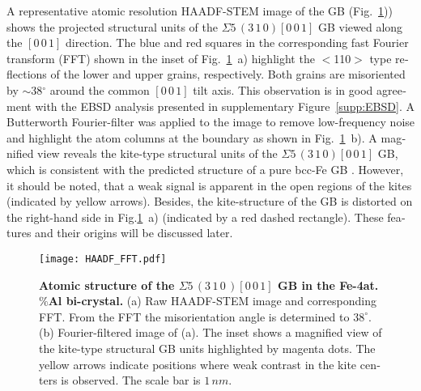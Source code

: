 \documentclass[12pt,a4paper,twoside,twocolumn,english,english]{article}
\begin{document}
\begin{otherlanguage}{english}
A representative atomic resolution HAADF-STEM image of the GB (Fig.~\ref{HAADF_FFT})) shows the projected structural units of the $\Sigma 5\,(3\,1\,0)[0\,0\,1]$ GB viewed along the $[0\,0\,1]$ direction. The blue and red squares in the corresponding fast Fourier transform (FFT) shown in the inset of Fig.~\ref{HAADF_FFT}~a) highlight the $<$110$>$ type reflections of the lower and upper grains, respectively. Both grains are misoriented by $\sim$38$^\circ$ around the common $[0\,0\,1]$ tilt axis. This observation is in good agreement with the EBSD analysis presented in supplementary Figure~\ref{supp:EBSD}. A Butterworth Fourier-filter was applied to the image to remove low-frequency noise and highlight the atom columns at the boundary as shown in Fig.~\ref{HAADF_FFT}~b). A magnified view reveals the kite-type structural units of the $\Sigma 5\,(3\,1\,0)[0\,0\,1]$ GB, which is consistent with the predicted structure of a pure bcc-Fe GB \cite{cak_first-principles_2008, medlin_defect_2017}. However, it should be noted, that a weak signal is apparent in the open regions of the kites (indicated by yellow arrows). Besides, the kite-structure of the GB is distorted on the right-hand side in Fig.\ref{HAADF_FFT}~a) (indicated by a red dashed rectangle). These features and their origins will be discussed later.

\begin{figure}[htbp]
\texttt{[image: HAADF\_FFT.pdf]}
\caption{\textbf{Atomic structure of the $\Sigma 5\,(3\,1\,0\,) [0\,0\,1]$ GB in the Fe-4at.$\%$Al bi-crystal.} (a) Raw HAADF-STEM image and corresponding FFT. From the FFT the misorientation angle is determined to $38^\circ$. (b) Fourier-filtered image of (a). The inset shows a magnified view of the kite-type structural GB units highlighted by magenta dots. The yellow arrows indicate positions where weak contrast in the kite centers is observed. The scale bar is $1\,nm$.}
\label{HAADF_FFT}
\end{figure} 


\end{otherlanguage}
\end{document}
